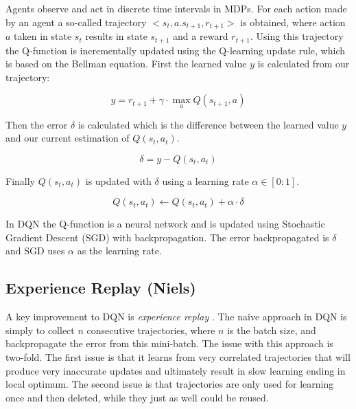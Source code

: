\documentclass{article}
\begin{document}
Agents observe and act in discrete time intervals in MDPs. For each action made by an agent a so-called trajectory $<s_{t}, a. s_{t+1}, r_{t+1}>$ is obtained, where action $a$ taken in state $s_{t}$ results in state $s_{t+1}$ and a reward $r_{t+1}$. Using this trajectory the Q-function is incrementally updated using the Q-learning update rule, which is based on the Bellman equation. First the learned value $y$ is calculated from our trajectory:

\begin{equation}
y = r_{t+1} +\gamma \cdot \max_{a}Q(s_{t+1}, a)  
\end{equation}

Then the error $\delta$ is calculated which is the difference between the learned value $y$ and our current estimation of $Q(s_{t},a_{t})$.

\begin{equation}
\delta = y - Q(s_{t},a_{t})
\end{equation}

Finally $Q(s_{t},a_{t})$ is updated with $\delta$ using a learning rate $\alpha \in [0:1]$.

\begin{equation}
Q(s_{t},a_{t}) \leftarrow Q(s_{t},a_{t}) + \alpha \cdot \delta    
\end{equation}

In DQN the Q-function is a neural network and is updated using Stochastic Gradient Descent (SGD) with backpropagation. The error backpropagated is $\delta$ and SGD uses $\alpha$ as the learning rate.  

\subsection{Experience Replay (Niels)}

A key improvement to DQN is \emph{experience replay} \cite{mnih2015human}. The naive approach in DQN is simply to collect $n$ consecutive trajectories, where $n$ is the batch size, and backpropagate the error from this mini-batch. The issue with this approach is two-fold. The first issue is that it learns from very correlated trajectories that will produce very inaccurate updates and ultimately result in slow learning ending in local optimum. The second issue is that trajectories are only used for learning once and then deleted, while they just as well could be reused. 
\end{document}
